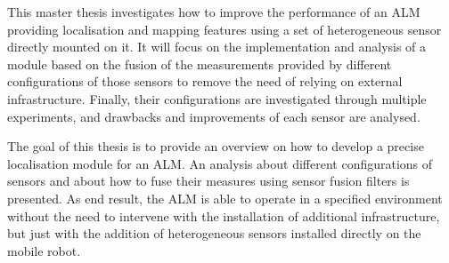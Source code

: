 
\noindent
This master thesis investigates how to improve the performance of an \gls{ALM} providing localisation and mapping features using a set of heterogeneous sensor directly mounted on it.
It will focus on the implementation and analysis of a module based on the fusion of the measurements provided by different configurations of those sensors to remove the need of relying on external infrastructure.
Finally, their configurations are investigated through multiple experiments, and drawbacks and improvements of each sensor are analysed.

The goal of this thesis is to provide an overview on how to develop a precise localisation module for an \gls{ALM}.
An analysis about different configurations of sensors and about how to fuse their measures using sensor fusion filters is presented.
As end result, the \gls{ALM} is able to operate in a specified environment without the need to intervene with the installation of additional infrastructure, but just with the addition of heterogeneous sensors installed directly on the mobile robot.

